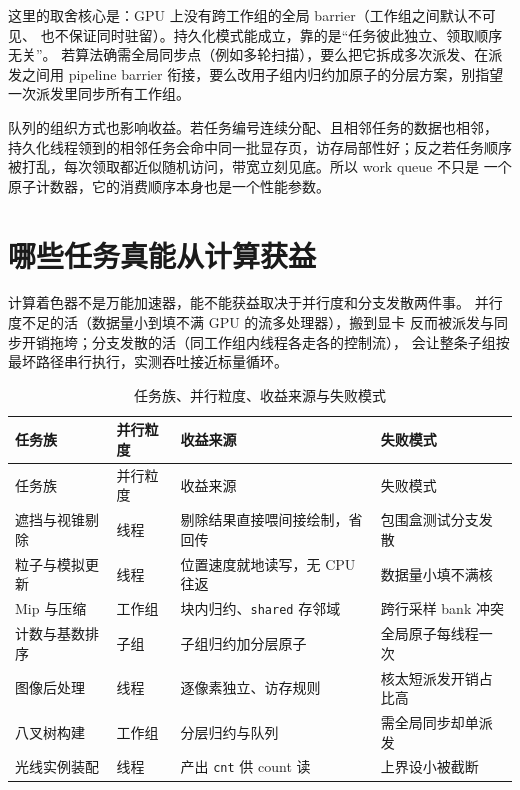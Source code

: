 \documentclass[12pt,a4paper,fontset=fandol]{ctexbook}
\newcommand{\Tp}[1]{\texttt{#1}}
\newcommand{\Lang}[1]{\textsf{#1}}
\newcommand{\DomCPU}{\Lang{CPU}}
\newcommand{\DomGPU}{\Lang{GPU}}
\begin{document}
这里的取舍核心是：\DomGPU{} 上没有跨工作组的全局 barrier（工作组之间默认不可见、
也不保证同时驻留）。持久化模式能成立，靠的是``任务彼此独立、领取顺序无关''。
若算法确需全局同步点（例如多轮扫描），要么把它拆成多次派发、在派发之间用
pipeline barrier 衔接，要么改用子组内归约加原子的分层方案，别指望一次派发里同步所有工作组。

队列的组织方式也影响收益。若任务编号连续分配、且相邻任务的数据也相邻，
持久化线程领到的相邻任务会命中同一批显存页，访存局部性好；反之若任务顺序
被打乱，每次领取都近似随机访问，带宽立刻见底。所以 work queue 不只是
一个原子计数器，它的消费顺序本身也是一个性能参数。

\section{哪些任务真能从计算获益}

计算着色器不是万能加速器，能不能获益取决于并行度和分支发散两件事。
并行度不足的活（数据量小到填不满 \DomGPU{} 的流多处理器），搬到显卡
反而被派发与同步开销拖垮；分支发散的活（同工作组内线程各走各的控制流），
会让整条子组按最坏路径串行执行，实测吞吐接近标量循环。

\begin{longtable}{>{\raggedright\arraybackslash}p{}
                 >{\raggedright\arraybackslash}p{}
                 >{\raggedright\arraybackslash}p{}
                 >{\raggedright\arraybackslash}p{}}
\caption{任务族、并行粒度、收益来源与失败模式}\label{tab:ch08-taskmap} \\
\toprule
任务族 & 并行粒度 & 收益来源 & 失败模式 \\ \midrule
\endfirsthead
\toprule
任务族 & 并行粒度 & 收益来源 & 失败模式 \\ \midrule
\endhead
\bottomrule
\endfoot
遮挡与视锥剔除 & 线程 & 剔除结果直接喂间接绘制，省回传 & 包围盒测试分支发散 \\
粒子与模拟更新 & 线程 & 位置速度就地读写，无 \DomCPU{} 往返 & 数据量小填不满核 \\
Mip 与压缩 & 工作组 & 块内归约、\Tp{shared} 存邻域 & 跨行采样 bank 冲突 \\
计数与基数排序 & 子组 & 子组归约加分层原子 & 全局原子每线程一次 \\
图像后处理 & 线程 & 逐像素独立、访存规则 & 核太短派发开销占比高 \\
八叉树构建 & 工作组 & 分层归约与队列 & 需全局同步却单派发 \\
光线实例装配 & 线程 & 产出 \Tp{cnt} 供 count 读 & 上界设小被截断 \\
\end{longtable}
\end{document}
